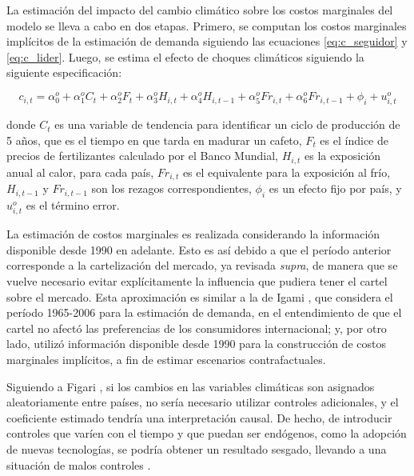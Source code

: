 La estimación del impacto del cambio climático sobre los costos marginales del modelo se lleva a cabo en dos etapas. Primero, se computan los costos marginales implícitos de la estimación de demanda siguiendo las ecuaciones \eqref{eq:c_seguidor} y \eqref{eq:c_lider}. Luego, se estima el efecto de choques climáticos siguiendo la siguiente especificación:

\begin{equation}
    c_{i,t} = \alpha^{o}_{0} + 
\alpha^{o}_{1}C_{t} +
\alpha^{o}_{2}F_{t} +
\alpha^{o}_{3}H_{i, t} +
\alpha^{o}_{4}H_{i, t-1} +
\alpha^{o}_{5}Fr_{i, t} +
\alpha^{o}_{6}Fr_{i, t-1} +
\phi_{i}+u^{o}_{i,t}
\end{equation} 

donde $C_{t}$ es una variable de tendencia para identificar un ciclo de producción de 5 años, que es el tiempo en que tarda en madurar un cafeto, $F_{t}$ es el índice de precios de fertilizantes calculado por el Banco Mundial, $H_{i, t}$ es la exposición anual al calor, para cada país, $Fr_{i, t}$ es el equivalente para la exposición al frío, $H_{i, t-1}$ y $Fr_{i, t-1}$ son los rezagos correspondientes, $\phi_{i}$ es un efecto fijo por país, y $u^{o}_{i,t}$ es el término error.

La estimación de costos marginales es realizada considerando la información disponible desde 1990 en adelante. Esto es así debido a que el período anterior corresponde a la cartelización del mercado, ya revisada \textit{supra}, de manera que se vuelve necesario evitar explícitamente la influencia que pudiera tener el cartel sobre el mercado. Esta aproximación es similar a la de Igami \citeyearpar{igami2015market}, que considera el período 1965-2006 para la estimación de demanda, en el entendimiento de que el cartel no afectó las preferencias de los consumidores internacional; y, por otro lado, utilizó información disponible desde 1990 para la construcción de costos marginales implícitos, a fin de estimar escenarios contrafactuales. 

Siguiendo a Figari \citeyearpar{figari2025climate}, si los cambios en las variables climáticas son asignados aleatoriamente entre países, no sería necesario utilizar controles adicionales, y el coeficiente estimado tendría una interpretación causal. De hecho, de introducir controles que varíen con el tiempo y que puedan ser endógenos, como la adopción de nuevas tecnologías, se podría obtener un resultado sesgado, llevando a una situación de malos controles \citep{angrist2009mostly, hsiang2016}.


